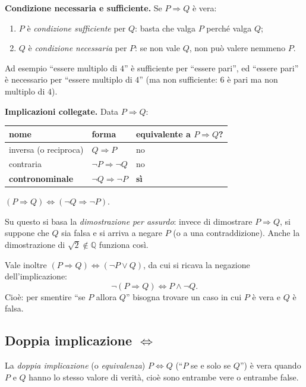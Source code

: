 \documentclass[11pt,a4paper]{article}
\begin{document}
\textbf{Condizione necessaria e sufficiente.} Se $P \Rightarrow Q$ è vera:
\begin{enumerate}
    \item $P$ è \emph{condizione sufficiente} per $Q$: basta che valga $P$
          perché valga $Q$;
    \item $Q$ è \emph{condizione necessaria} per $P$: se non vale $Q$, non
          può valere nemmeno $P$.
\end{enumerate}
Ad esempio ``essere multiplo di $4$'' è sufficiente per ``essere pari'', ed
``essere pari'' è necessario per ``essere multiplo di $4$'' (ma non
sufficiente: $6$ è pari ma non multiplo di $4$).

\textbf{Implicazioni collegate.} Data $P \Rightarrow Q$:
\begin{center}
\begin{tabular}{l|l|l}
nome & forma & equivalente a $P \Rightarrow Q$? \\ \hline
inversa (o reciproca) & $Q \Rightarrow P$ & no \\
contraria & $\neg P \Rightarrow \neg Q$ & no \\
\textbf{contronominale} & $\neg Q \Rightarrow \neg P$ & \textbf{sì}
\end{tabular}
\end{center}

\begin{teorema}[Contronominale]
$(P \Rightarrow Q) \iff (\neg Q \Rightarrow \neg P)$.
\end{teorema}

Su questo si basa la \emph{dimostrazione per assurdo}: invece di dimostrare
$P \Rightarrow Q$, si suppone che $Q$ sia falsa e si arriva a negare $P$
(o a una contraddizione). Anche la dimostrazione di $\sqrt{2} \notin
\mathbb{Q}$ funziona così.

Vale inoltre $(P \Rightarrow Q) \iff (\neg P \lor Q)$, da cui si ricava la
negazione dell'implicazione:
\[
\neg(P \Rightarrow Q) \iff P \land \neg Q.
\]
Cioè: per smentire ``se $P$ allora $Q$'' bisogna trovare un caso in cui
$P$ è vera e $Q$ è falsa.

\subsection{Doppia implicazione $\Leftrightarrow$}

\begin{definizione}
La \emph{doppia implicazione} (o \emph{equivalenza}) $P \Leftrightarrow Q$
(``$P$ se e solo se $Q$'') è vera quando $P$ e $Q$ hanno lo stesso valore
di verità, cioè sono entrambe vere o entrambe false.
\end{definizione}
\end{document}
